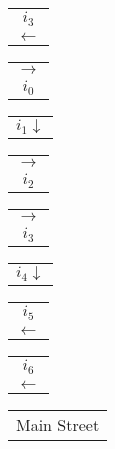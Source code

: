 \documentclass{book}
\begin{document}
\stopmpxshipout
\mpxshipout%
{\small \renewcommand{\arraystretch}{.9}
              \begin{tabular}[b]{@{}c@{}}
                   $i_3$ \\ $\longleftarrow$     
              \end{tabular}}%
\stopmpxshipout
\mpxshipout%
{\small \renewcommand{\arraystretch}{.9}
              \begin{tabular}[t]{@{}c@{}}
                  $\longrightarrow$ \\ $i_0$     
              \end{tabular}}%
\stopmpxshipout
\mpxshipout%
{\small \renewcommand{\arraystretch}{.9}
              \begin{tabular}[t]{@{}r@{}}
                  $i_1 \downarrow$    
              \end{tabular}}%
\stopmpxshipout
\mpxshipout%
{\small \renewcommand{\arraystretch}{.9}
              \begin{tabular}[t]{@{}c@{}}
                  $\longrightarrow$ \\ $i_2$     
              \end{tabular}}%
\stopmpxshipout
\mpxshipout%
{\small \renewcommand{\arraystretch}{.9}
              \begin{tabular}[t]{@{}c@{}}
                  $\longrightarrow$ \\ $i_3$     
              \end{tabular}}%
\stopmpxshipout
\mpxshipout%
{\small \renewcommand{\arraystretch}{.9}
              \begin{tabular}[t]{@{}r@{}}
                  $i_4 \downarrow$    
              \end{tabular}}%
\stopmpxshipout
\mpxshipout%
{\small \renewcommand{\arraystretch}{.9}
              \begin{tabular}[b]{@{}c@{}}
                   $i_5$ \\ $\longleftarrow$     
              \end{tabular}}%
\stopmpxshipout
\mpxshipout%
{\small \renewcommand{\arraystretch}{.9}
              \begin{tabular}[b]{@{}c@{}}
                   $i_6$ \\ $\longleftarrow$     
              \end{tabular}}%
\stopmpxshipout
\mpxshipout%
{\small \renewcommand{\arraystretch}{.9}
              \circuitfont\begin{tabular}[b]{@{}c@{}}
                  Main Street     
              \end{tabular}}%
\end{document}

